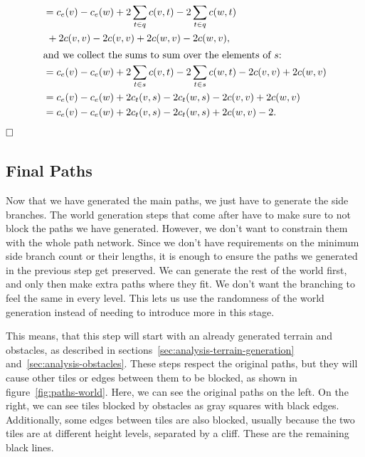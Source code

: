 \begin{align*}
     & = c_e(v) - c_e(w)  + 2 \sum_{t \in q} c(v,t) - 2 \sum_{t \in q} c(w,t)                                                                                 \\
     & \ + 2c(v,v) - 2c(v,v) + 2c(w,v) - 2c(w,v),                                                                                                             \\
    \intertext{and we collect the sums to sum over the elements of $s$:}
     & = c_e(v) - c_e(w)  + 2 \sum_{t \in s} c(v,t) - 2 \sum_{t \in s} c(w,t) - 2c(v,v) + 2c(w,v)                                                             \\
     & = c_e(v) - c_e(w)  + 2 c_t(v,s) - 2 c_t(w,s) - 2c(v,v) + 2c(w,v)                                                                                       \\
     & = c_e(v) - c_e(w)  + 2 c_t(v,s) - 2 c_t(w,s) + 2c(w,v) - 2 .                                                                                           \\
\end{align*}
$\hfill\square$

\subsection{Final Paths}

Now that we have generated the main paths, we just have to generate the side branches.
The world generation steps that come after have to make sure to not block the paths we have generated.
However, we don't want to constrain them with the whole path network.
Since we don't have requirements on the minimum side branch count or their lengths, it is enough to ensure the paths we generated in the previous step get preserved.
We can generate the rest of the world first, and only then make extra paths where they fit.
We don't want the branching to feel the same in every level.
This lets us use the randomness of the world generation instead of needing to introduce more in this stage.

This means, that this step will start with an already generated terrain and obstacles, as described in sections~\ref{sec:analysis-terrain-generation} and~\ref{sec:analysis-obstacles}.
These steps respect the original paths, but they will cause other tiles or edges between them to be blocked, as shown in figure~\ref{fig:paths-world}.
Here, we can see the original paths on the left.
On the right, we can see tiles blocked by obstacles as gray squares with black edges.
Additionally, some edges between tiles are also blocked, usually because the two tiles are at different height levels, separated by a cliff.
These are the remaining black lines.

